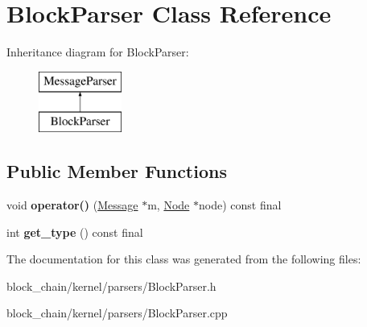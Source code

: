 \hypertarget{classBlockParser}{}\section{Block\+Parser Class Reference}
\label{classBlockParser}
Inheritance diagram for Block\+Parser\+:\begin{figure}[H]
\begin{center}
\leavevmode
\includegraphics[height=2.000000cm]{classBlockParser}
\end{center}
\end{figure}
\subsection*{Public Member Functions}
\begin{DoxyCompactItemize}
\item 
\mbox{\label{classBlockParser_acc2f5e6a6d3a30464454cfc85ff7ba9a}} 
void {\bfseries operator()} (\mbox{\hyperlink{classMessage}{Message}} $\ast$m, \mbox{\hyperlink{classNode}{Node}} $\ast$node) const final
\item 
\mbox{\label{classBlockParser_aa7334a81b976ec6244c0992cda44a824}} 
int {\bfseries get\+\_\+type} () const final
\end{DoxyCompactItemize}


The documentation for this class was generated from the following files\+:\begin{DoxyCompactItemize}
\item 
block\+\_\+chain/kernel/parsers/Block\+Parser.\+h\item 
block\+\_\+chain/kernel/parsers/Block\+Parser.\+cpp\end{DoxyCompactItemize}
